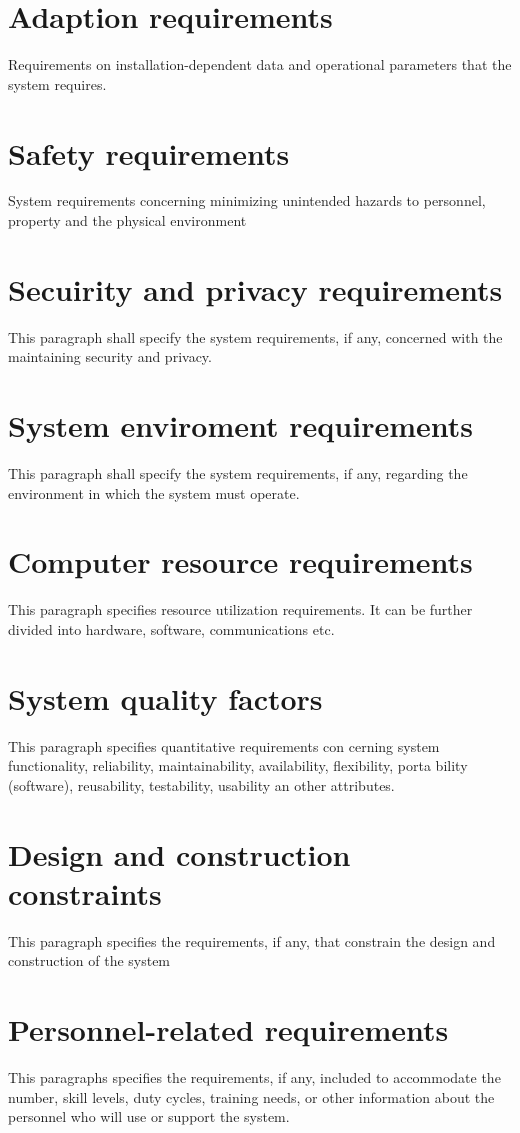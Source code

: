 \section{Adaption requirements}
Requirements on installation-dependent data and operational parameters that the system requires.

\section{Safety requirements}
System requirements concerning minimizing unintended hazards to personnel, property and the physical environment

\section{Secuirity and privacy requirements}
This paragraph shall specify the system requirements, if any, concerned with the maintaining security and privacy.

\section{System enviroment requirements}
This paragraph shall specify the system requirements, if any, regarding the environment in which the system must operate.

\section{Computer resource requirements}
This paragraph specifies resource utilization requirements. It can be further divided into hardware, software, communications etc.

\section{System quality factors}
This paragraph specifies quantitative requirements con cerning system functionality, reliability, maintainability, availability, flexibility, porta bility (software), reusability, testability, usability an other attributes.

\section{Design and construction constraints}
This paragraph specifies the requirements, if any, that constrain the design and construction of the system

\section{Personnel-related requirements}
This paragraphs specifies the requirements, if any, included to accommodate the number, skill levels, duty cycles, training needs, or other information about the personnel who will use or support the system.

